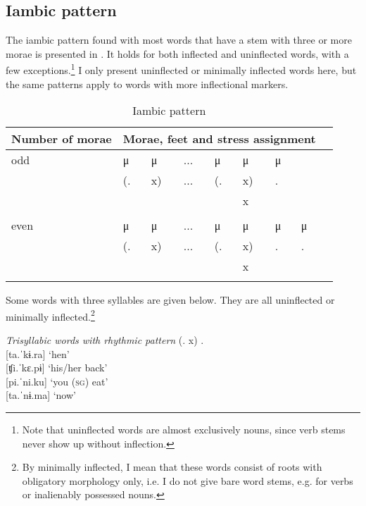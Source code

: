 \subsection{Iambic pattern}\label{sec:IambicPattern}

The iambic pattern found with most words that have a stem with three or more morae is presented in . It holds for both inflected and uninflected words, with a few exceptions.\footnote{Note that uninflected words are almost exclusively nouns, since verb stems never show up without inflection.} I  only present uninflected or minimally inflected words here, but the same patterns apply to words with more inflectional markers.

\begin{table}
\caption{Iambic pattern}

\begin{tabular}{lllllllll}
\lsptoprule 
Number of morae & \multicolumn{7}{l}{Morae, feet and stress assignment}\\
\midrule
odd & μ & μ & ... & μ & μ & μ &\\
& (. & x) & ... & (. & x) & .& \\
&& & & & x & & \\
&& & & & &\\
even & μ & μ & ... & μ & μ & μ & μ \\
& (. & x) & ... & (. & x) & . & . &\\
&& & & & x & & \\
\lspbottomrule
\end{tabular}

\label{table:IambicMorae}
\end{table}



Some words with three syllables are given below. They are all uninflected or minimally inflected.\footnote{By minimally inflected, I mean that these words consist of roots with obligatory morphology only, i.e. I do not give bare word stems, e.g. for verbs or inalienably possessed nouns.} 


\ea\label{ex:TrisyllabicWords}
 \textit{Trisyllabic words with rhythmic pattern} (. x) .\\
    {[}ta.ˈkɨ.ra] \tab  ‘hen’\\
    {[}ʧi.ˈkɛ.pɨ] \tab  ‘his/her back’\\
    {[}pi.ˈni.ku] \tab  ‘you (\textsc{sg}) eat’\\
    {[}ta.ˈnɨ.ma] \tab  ‘now’  \\%
    \xe

